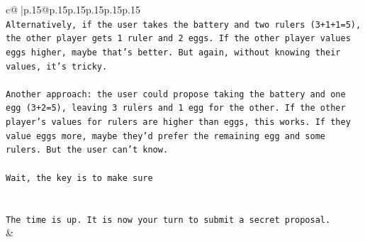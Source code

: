 \documentclass{article}
\begin{document}
{\begin{supertabular}{c@{$\;$}|p{.15\linewidth}@{}p{.15\linewidth}p{.15\linewidth}p{.15\linewidth}p{.15\linewidth}p{.15\linewidth}}
{{{\\ 
\texttt{Alternatively, if the user takes the battery and two rulers (3+1+1=5), the other player gets 1 ruler and 2 eggs. If the other player values eggs higher, maybe that's better. But again, without knowing their values, it's tricky.} \\
\\ 
\texttt{Another approach: the user could propose taking the battery and one egg (3+2=5), leaving 3 rulers and 1 egg for the other. If the other player's values for rulers are higher than eggs, this works. If they value eggs more, maybe they'd prefer the remaining egg and some rulers. But the user can't know.} \\
\\ 
\texttt{Wait, the key is to make sure} \\
\\ 
\\ 
\texttt{The time is up. It is now your turn to submit a secret proposal.} \\
            }
        }
    }
    & \\ \\


\end{supertabular}}
\end{document}
